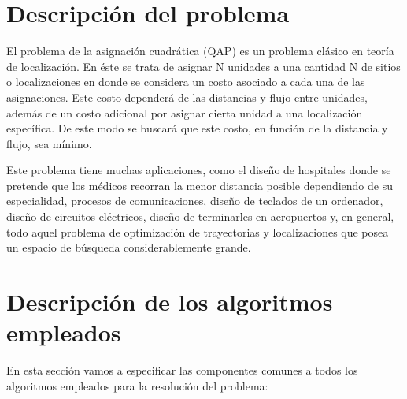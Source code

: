 \newpage %

\tableofcontents %

\listoffigures


\newpage




\section{Descripción del problema}
El problema de la asignación cuadrática (QAP) es un problema clásico en teoría de localización. En éste se trata de asignar N unidades a una cantidad N de sitios o localizaciones en donde se considera un costo asociado a cada una de las asignaciones. Este costo dependerá de las distancias y flujo entre unidades, además de un costo adicional por asignar cierta unidad a una localización específica. De este modo se buscará que este costo, en función de la distancia y flujo, sea mínimo.

Este problema tiene muchas aplicaciones, como el diseño de hospitales donde se pretende que los médicos recorran la menor distancia posible dependiendo de su especialidad, procesos de comunicaciones, diseño de teclados de un ordenador, diseño de circuitos eléctricos, diseño de terminarles en aeropuertos y, en general, todo aquel problema de optimización de trayectorias y localizaciones que posea un espacio de búsqueda considerablemente grande. 

\section{Descripción de los algoritmos empleados}

En esta sección vamos a especificar las componentes comunes a todos los algoritmos empleados para la resolución del problema:

